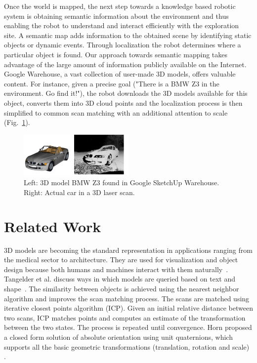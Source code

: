 \documentclass{llncs}
\newcommand{\gs}{Google SketchUp }
\begin{document}
Once the world is mapped, the next step towards a knowledge based
robotic system is obtaining semantic information about the environment
and thus enabling the robot to understand and interact efficiently
with the exploration site. A semantic map adds information to the
obtained scene by identifying static objects or dynamic
events. Through localization the robot determines where a particular
object is found.
%
Our approach towards semantic mapping takes advantage of the large
amount of information publicly available on the Internet. Google
Warehouse, a vast collection of user-made 3D models, offers valuable
content. For instance, given a precise goal ("There is a BMW Z3 in the
environment. Go find it!"), the robot downloads the 3D models
available for this object, converts them into 3D cloud points and the
localization process is then simplified to common scan matching with
an additional attention to scale (Fig.~\ref{model_scan}).

\begin{figure}
  \centering
    \includegraphics[width=0.5\textwidth]{model_scan}
  \caption{Left: 3D model BMW Z3 found in \gs Warehouse. Right: Actual car in a 3D laser scan.}
  \label{model_scan}
\end{figure}


\section{Related Work}

3D models are becoming the standard representation in applications
ranging from the medical sector to architecture. They are used for
visualization and object design because both humans and machines
interact with them naturally~\cite{Remondino:2009,Beetz:2010}.
%
Tangelder et al. discuss ways in which models are queried based on
text and shape~\cite{Tangelder:2004}. The similarity between objects
is achieved using the nearest neighbor algorithm and improves the scan
matching process. The scans are matched using iterative closest points
algorithm (ICP). Given an initial relative distance between two scans,
ICP matches points and computes an estimate of the transformation
between the two states. The process is repeated until
convergence. Horn proposed a closed form solution of absolute
orientation using unit quaternions, which supports all the basic
geometric transformations (translation, rotation and scale)
\cite{Horn:1987}.
\end{document}

